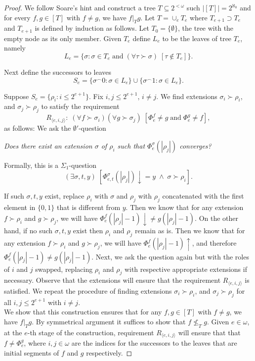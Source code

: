 \documentclass{article}
\begin{document}
  \begin{proof}
    We follow Soare's hint and construct a tree $T\subseteq2^{<\omega}$ such
    $|[T]|=2^{\aleph_0}$ and for every $f,g\in[T]$ with $f\neq g$, we have
    $f|_Tg$. Let $T=\cup_eT_e$ where $T_{e+1}\supset T_e$ and $T_{e+1}$ is
    defined by induction as follows. Let $T_0=\{\emptyset\}$, the tree with
    the empty node as its only member. Given $T_e$ define $L_e$ to be the
    leaves of tree $T_e$, namely
    \[L_e =\{\sigma: \sigma\in T_e\; \text{and}\; (\forall \tau \succ
    \sigma)\; [\tau\not\in T_e]\}.\]

    Next define the successors to leaves
    \[S_e =\{\sigma^\frown0: \sigma\in L_e\} \cup \{\sigma^\frown1:
    \sigma\in L_e\}.\]

    Suppose $S_e=\{\rho_i: i\leq2^{e+1}\}$. Fix $i,j\leq2^{e+1}$, $i\neq
    j$. We find extensions $\sigma_i\succ\rho_i$, and $\sigma_j\succ\rho_j$
    to satisfy the requirement
    \[R_{\langle e,i,j\rangle}:\; (\forall f\succ \sigma_i) (\forall g\succ
    \sigma_j)\; [\Phi_e^f\neq g\; \text{and}\; \Phi_e^g\neq f],\]
    as follows: We ask the $\emptyset'$-question
    \begin{center}
      \textit{Does there exist an extension $\sigma$ of $\rho_i$ such that
      $\Phi_e^{\sigma}(|\rho_j|)$ converges?}
    \end{center}

    Formally, this is a $\Sigma_1$-question 
    \[(\exists \sigma,t,y)\;
    [\Phi_{e,t}^\sigma (|\rho_j|)\downarrow=y\; \wedge\;
    \sigma\succ\rho_i].\]

    If such $\sigma,t,y$ exist, replace $\rho_i$ with $\sigma$ and $\rho_j$
    with $\rho_j$ concatenated with the first element in $\{0,1\}$ that is
    different from $y$. Then we know that for any extension $f\succ\rho_i$
    and $g\succ\rho_j$, we will have $\Phi_e^f(|\rho_j|-1)\downarrow\neq
    g(|\rho_j|-1)$. On the other hand, if no such $\sigma,t,y$ exist then
    $\rho_i$ and $\rho_j$ remain as is. Then we know that for any extension
    $f\succ\rho_i$ and $g\succ\rho_j$, we will have
    $\Phi_e^f(|\rho_j|-1)\uparrow$, and therefore $\Phi_e^f(|\rho_j|-1)\neq
    g(|\rho_j|-1)$. Next, we ask the question again but with the roles of
    $i$ and $j$ swapped, replacing $\rho_i$ and $\rho_j$ with respective
    appropriate extensions if necessary. Observe that the extensions will
    ensure that the requirement $R_{\langle e,i,j\rangle}$ is satisfied.
    We repeat the procedure of finding extensions $\sigma_i\succ\rho_i$,
    and $\sigma_j\succ\rho_j$ for all $i,j\leq2^{e+1}$ with $i\neq j$. \\

    We show that this construction ensures that for any $f,g\in[T]$ with
    $f\neq g$, we have $f|_Tg$. By symmetrical argument it suffices to show
    that $f\not\leq_T g$. Given $e\in\omega$, at the $e$-th stage of the
    construction, requirement $R_{\langle e,i,j\rangle}$ will ensure that
    that $f\neq\Phi_e^g$, where $i,j\in\omega$ are the indices for the
    successors to the leaves that are initial segments of $f$ and $g$
    respectively. 
  \end{proof}
\end{document}
